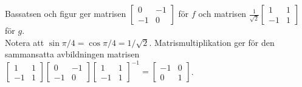 Bassatsen och figur ger matrisen $\begin{bmatrix}0&-1\\-1&0\end{bmatrix}$ för $f$ och matrisen $\frac{1}{\sqrt{2}}\begin{bmatrix}1&1\\-1&1\end{bmatrix}$ för $g$.\\
Notera att $\sin\pi/4 = \cos\pi/4 = 1/\sqrt{2}$. Matrismultiplikation ger för den sammansatta avbildningen matrisen\\
$\begin{bmatrix}1&1\\-1&1\end{bmatrix}\begin{bmatrix}0&-1\\-1&0\end{bmatrix}\begin{bmatrix}1&1\\-1&1\end{bmatrix}^{-1}=\begin{bmatrix}-1&0\\0&1\end{bmatrix}$.
